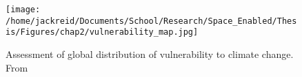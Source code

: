 \documentclass[notitlepage]{article}
\begin{document}
\begin{figure}[h]
	\centering
	\texttt{[image: /home/jackreid/Documents/School/Research/Space\_Enabled/Thesis/Figures/chap2/vulnerability\_map.jpg]}
	\caption[Assessment of global distribution of vulnerability to climate change]{Assessment of global distribution of vulnerability to climate change. From \cite{yoheSyntheticAssessmentGlobal2006}}
	\label{fig:vulnerability}
\end{figure}

%
%
%
%
%
\end{document}
